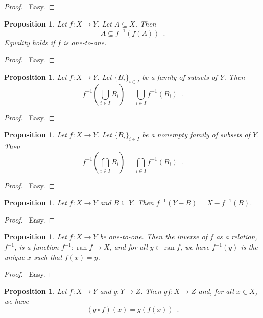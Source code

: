 \documentclass{report}
\let\qed\relax
\newtheorem{prop}[ax]{Proposition}
\theoremstyle{definition}
\newcommand{\ran}{\ensuremath{\operatorname{ran}}}
\begin{document}
\begin{proof}
\pf\ Easy. \qed
\end{proof}

\begin{prop}
Let $f : X \rightarrow Y$. Let $A \subseteq X$. Then
\[ A \subseteq f^{-1}(f(A)) \enspace . \]
Equality holds if $f$ is one-to-one.
\end{prop}

\begin{proof}
\pf\ Easy. \qed
\end{proof}

\begin{prop}
Let $f : X \rightarrow Y$. Let $\{B_i\}_{i \in I}$ be a family of subsets of $Y$. Then
\[ f^{-1} \left( \bigcup_{i \in I} B_i \right) = \bigcup_{i \in I} f^{-1}(B_i) \enspace . \]
\end{prop}

\begin{proof}
\pf\ Easy. \qed
\end{proof}

\begin{prop}
Let $f : X \rightarrow Y$. Let $\{B_i\}_{i \in I}$ be a nonempty family of subsets of $Y$. Then
\[ f^{-1} \left( \bigcap_{i \in I} B_i \right) = \bigcap_{i \in I} f^{-1}(B_i) \enspace . \]
\end{prop}

\begin{proof}
\pf\ Easy. \qed
\end{proof}

\begin{prop}
Let $f : X \rightarrow Y$ and $B \subseteq Y$. Then $f^{-1}(Y - B) = X - f^{-1}(B)$.
\end{prop}

\begin{proof}
\pf\ Easy. \qed
\end{proof}

\begin{prop}
Let $f : X \rightarrow Y$ be one-to-one. Then the inverse of $f$ as a relation, $f^{-1}$, is a function $f^{-1} : \ran f \rightarrow X$, and for all $y \in \ran f$, we have $f^{-1}(y)$ is the unique $x$ such that $f(x) = y$.
\end{prop}

\begin{proof}
\pf\ Easy. \qed
\end{proof}

\begin{prop}
Let $f : X \rightarrow Y$ and $g : Y \rightarrow Z$. Then $g f : X \rightarrow Z$ and, for all $x \in X$, we have
\[ (g \circ f)(x) = g(f(x)) \enspace . \]
\end{prop}
\end{document}
